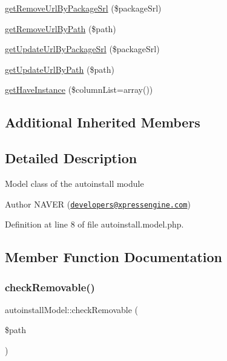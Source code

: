\begin{DoxyCompactItemize}
\hyperlink{classautoinstallModel_aa2b3fa8f08e15bfb1a9a061aca6dfa8c}{get\+Remove\+Url\+By\+Package\+Srl} (\$package\+Srl)
\item 
\hyperlink{classautoinstallModel_a40c61ad733cb70958d2c550f06abc15d}{get\+Remove\+Url\+By\+Path} (\$path)
\item 
\hyperlink{classautoinstallModel_a20c447d210dff0edc286007b92ec881f}{get\+Update\+Url\+By\+Package\+Srl} (\$package\+Srl)
\item 
\hyperlink{classautoinstallModel_a560f4c8850324ee4e0c3dc74573bc7d9}{get\+Update\+Url\+By\+Path} (\$path)
\item 
\hyperlink{classautoinstallModel_ac2f036319c53b9a9392a7b4534fef4fd}{get\+Have\+Instance} (\$column\+List=array())
\end{DoxyCompactItemize}
\subsection*{Additional Inherited Members}


\subsection{Detailed Description}
Model class of the autoinstall module \begin{DoxyAuthor}{Author}
N\+A\+V\+ER (\href{mailto:developers@xpressengine.com}{\tt developers@xpressengine.\+com}) 
\end{DoxyAuthor}


Definition at line 8 of file autoinstall.\+model.\+php.



\subsection{Member Function Documentation}
\mbox{\label{classautoinstallModel_ab4637f5520f16fffe622f5abd73253b0}} 
\subsubsection{\texorpdfstring{check\+Removable()}{checkRemovable()}}
{\footnotesize\ttfamily autoinstall\+Model\+::check\+Removable (\begin{DoxyParamCaption}\item[{}]{\$path }\end{DoxyParamCaption})}

